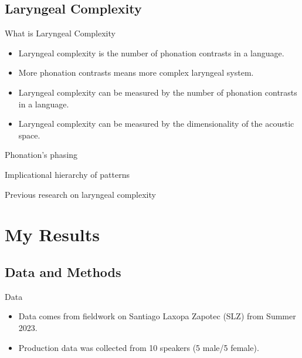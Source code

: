\documentclass{beamer}
\begin{document}
\subsection{Laryngeal Complexity}

\begin{frame}{What is Laryngeal Complexity}
  \begin{itemize}
    \item Laryngeal complexity is the number of phonation contrasts in a language.
    \item More phonation contrasts means more complex laryngeal system.
    \item Laryngeal complexity can be measured by the number of phonation contrasts in a language.
    \item Laryngeal complexity can be measured by the dimensionality of the acoustic space.
  \end{itemize}
\end{frame}

\begin{frame}{Phonation's phasing}
  
\end{frame}

\begin{frame}{Implicational hierarchy of patterns}
  
\end{frame}

\begin{frame}{Previous research on laryngeal complexity}

\end{frame}

\section{My Results}
\subsection{Data and Methods}
\begin{frame}{Data}
  \begin{itemize}
    \item Data comes from fieldwork on Santiago Laxopa Zapotec (SLZ) from Summer 2023.
    \item Production data was collected from 10 speakers (5 male/5 female).
  \end{itemize}
\end{frame}
\end{document}

